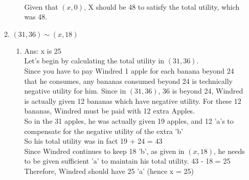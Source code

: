 \documentclass[11pt]{article}
\begin{document}
\begin{enumerate}
\begin{enumerate}
\begin{enumerate}
            \\Given that $(x, 0)$, X should be 48 to satisfy the total utility, which was 48.
        \end{enumerate}
        \item $(31,36)\sim (x,18)$
        \begin{enumerate}
            \item Ans: x is 25
            \\Let's begin by calculating the total utility in $(31,36)$.
            \\Since you have to pay Windred 1 apple for each banana beyond 24 that he consumes, any bananas consumed beyond 24 is technically negative utility for him. Since in $(31,36)$, 36 is beyond 24, Windred is actually given 12 bananas which have negative utility. For these 12 bananas, Windred must be paid with 12 extra Apples.
            \\So in the 31 apples, he was actually given 19 apples, and 12 'a's to compensate for the negative utility of the extra 'b'
            \\So his total utility was in fact 19 + 24 = 43
            \\Since Windred continues to keep 18 'b', as given in $(x,18)$, he needs to be given sufficient 'a' to maintain his total utility. 43 - 18 = 25
            \\Therefore, Windred should have 25 'a' (hence x = 25)
        \end{enumerate}
    \end{enumerate}


\end{enumerate}
\end{document}
